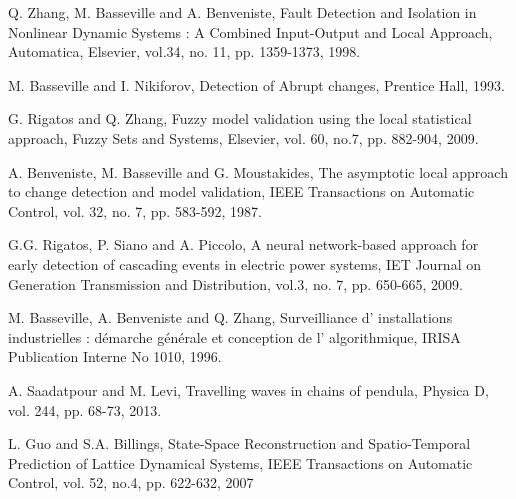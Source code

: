 \documentclass[journal]{IEEEtran}
\begin{document}
\begin{thebibliography}{100}
 \label{ZhaBasBen98}
Q. Zhang, M. Basseville and A. Benveniste, Fault Detection and Isolation in Nonlinear Dynamic
Systems : A Combined Input-Output and Local Approach, Automatica, Elsevier, vol.34, no. 11, pp. 1359-1373,
1998.

 \label{BasNik93}
M. Basseville and I. Nikiforov, Detection of Abrupt changes, Prentice Hall, 1993.

 \label{RigZha09}
G. Rigatos and Q. Zhang, Fuzzy model validation using the local statistical approach, Fuzzy
Sets and Systems, Elsevier, vol. 60, no.7, pp. 882-904, 2009.

 \label{BeBaMou87}
A. Benveniste, M. Basseville and G. Moustakides, The asymptotic local approach to change detection
and model validation, IEEE Transactions on Automatic Control, vol. 32, no. 7, pp. 583-592, 1987.

 \label{RigSiaPic09}
G.G. Rigatos, P. Siano and A. Piccolo, A neural network-based approach for early detection
of cascading events in electric power systems, IET Journal on Generation Transmission and Distribution, vol.3, no. 7, pp. 650-665, 2009.

 \label{BasBenZha96}
M. Basseville, A. Benveniste and Q. Zhang, Surveilliance d' installations industrielles : d\'{e}marche
g\'{e}n\'{e}rale et conception de l' algorithmique, IRISA Publication Interne No 1010, 1996.

 \label{SaaLev13}
A. Saadatpour and M. Levi, Travelling waves in chains of pendula, Physica D, vol. 244, pp. 68-73, 2013.

 \label{GuoBil07}
L. Guo and S.A. Billings, State-Space Reconstruction and Spatio-Temporal Prediction of Lattice Dynamical Systems, IEEE Transactions on Automatic Control, vol. 52, no.4, pp. 622-632, 2007














\end{thebibliography}
\end{document}
